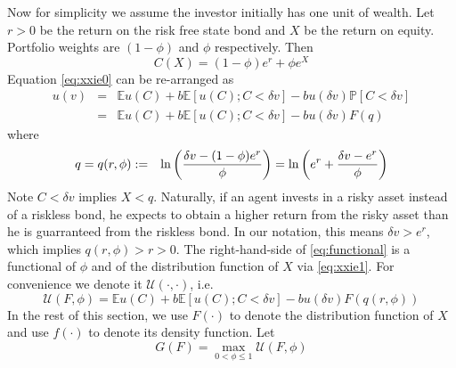 \documentclass{article}
\newcommand{\E}{
  \mathbb{E}
}
\renewcommand{\P}{
  \mathbb{P}
}
\newcommand{\1}[1]{
  \mathbf{1}_{\{#1\}}
}
\begin{document}
Now for simplicity we assume the investor initially has one unit of
wealth. Let $r > 0$ be the return on the risk free state bond and $X$
be the return on equity. Portfolio weights are $\left(1-\phi\right)$
and $\phi$ respectively. Then
\begin{equation}
  \label{eq:xxie1}
  C(X) = (1 - \phi) e^r + \phi e^X
\end{equation}
Equation \eqref{eq:xxie0} can be re-arranged as
\begin{eqnarray}
u(v) &=& \E u(C) + b \E [u(C); C < \delta v] - b u(\delta v) \P[C < \delta v] \nonumber \\
&=& \E u(C) + b \E [u(C); C < \delta v] - b u(\delta v) F(q) \label{eq:functional}
\end{eqnarray}
where
\begin{eqnarray*}
  q = q(r, \phi) &:=& \ln \left( {
      \delta v - (1 - \phi) e^r
      \over
      \phi
    } \right) = \ln\left(
    e^r + {\delta v - e^r \over \phi}
  \right)
\end{eqnarray*}
Note $C < \delta v$ implies $X < q$. Naturally, if an agent invests in
a risky asset instead of a riskless bond, he expects to obtain a
higher return from the risky asset than he is guarranteed from the
riskless bond. In our notation, this means $\delta v > e^r$, which
implies $q(r, \phi) > r > 0$. The right-hand-side of
\eqref{eq:functional} is a functional of $\phi$ and of the distribution
function of $X$ via \eqref{eq:xxie1}. For convenience we denote it
$\mathcal U(\cdot, \cdot)$, i.e.
\begin{equation}
  \label{eq:U_functional}
  \mathcal U(F, \phi)
  = 
  \E u(C) + b \E [u(C); C < \delta v] - b u(\delta v) F(q(r, \phi))
\end{equation}
In the rest of this section, we use $F(\cdot)$ to denote the
distribution function of $X$ and use $f(\cdot)$ to denote its density
function. Let
\begin{equation}
  \label{eq:G_functional}
  G(F) = \max_{0 < \phi \leq 1} \mathcal U(F, \phi)  
\end{equation}
\end{document}
